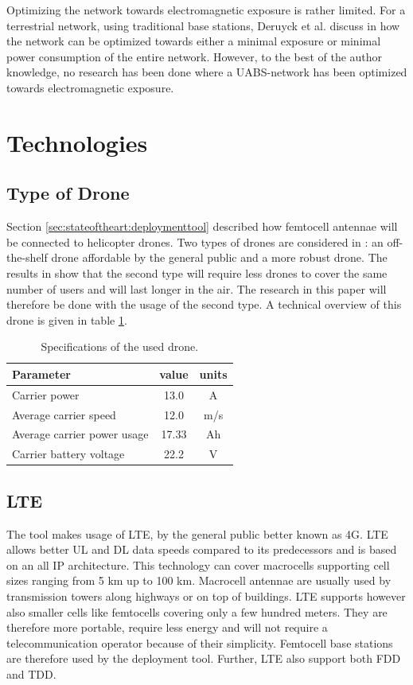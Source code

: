 Optimizing the network towards electromagnetic exposure is rather limited. For a terrestrial network, using traditional base stations,
Deruyck et al. discuss in \cite{J1} how the network can be optimized towards either a minimal exposure or minimal power consumption of the entire network.
However, to the best of the author knowledge, no research has been done where a \gls{UABS}-network has been optimized towards electromagnetic exposure.

\section{Technologies}
\subsection{Type of Drone}
\label{sec:typeofdrone}

Section \ref{sec:stateoftheart:deploymenttool} described how femtocell antennae will be connected to helicopter drones. Two types of 
drones are considered in \cite{J2}: an off-the-shelf drone affordable by the general public and a more robust drone. The results in \cite{J2}
show that the second type will require less drones to cover the same number of users and will last longer in the air. The research in this paper
will therefore be done with the usage of the second type. A technical overview of this drone is given in table \ref{table:dronespecs}.

\begin{table}[h!]
\centering
\begin{tabular}{|l|c|c|}
\hline
 Parameter          & value      & units   \\    \hline
 Carrier power      & 13.0 &A \\
 Average carrier speed           & 12.0 &m/s       \\ 
 Average carrier power usage    & 17.33& Ah      \\ 
 Carrier battery voltage        & 22.2 &V \\ \hline
\end{tabular}
\caption{Specifications of the used drone.}
\label{table:dronespecs}
\end{table}

\subsection{LTE}
The tool makes usage of \gls{LTE}, by the general public better known as 4G.  \gls{LTE} allows better \gls{UL} and \gls{DL} data speeds 
compared to its predecessors and is based on an all IP architecture. This technology can cover macrocells supporting cell sizes ranging from 5 km up to 100 km. 
Macrocell antennae are usually used by transmission towers along highways or on top of buildings. LTE supports however also smaller cells like
femtocells covering only a few hundred meters. They are therefore more portable, require less energy and will not require a telecommunication operator because
of their simplicity. Femtocell base stations are therefore used by the deployment tool.
Further, \gls{LTE} also support both \gls{FDD} and \gls{TDD}.

